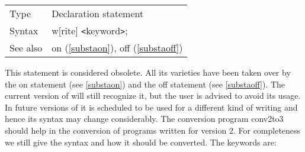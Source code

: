 \noindent \begin{tabular}{ll}
Type & Declaration statement\\
Syntax & w[rite] {\tt<}keyword{\tt>};
\\ See also & on (\ref{substaon}), off (\ref{substaoff})
\end{tabular} \vspace{4mm}

\noindent This statement is considered 
obsolete. All its varieties have been taken over by the 
on statement (see \ref{substaon}) and the off 
statement (see \ref{substaoff}). The current version of {\FORM} will still 
recognize it, but the user is advised to avoid its usage. In future 
versions of {\FORM} it is scheduled to be used for a different kind of 
writing and hence its syntax may change considerably. The conversion 
program conv2to3 should help in the conversion of programs written for 
version 2. For completeness we still give the syntax and how it should be 
converted. The keywords are: \vspace{4mm}
 

 
 

 
 
 

 
 
 

\vspace{10mm}


